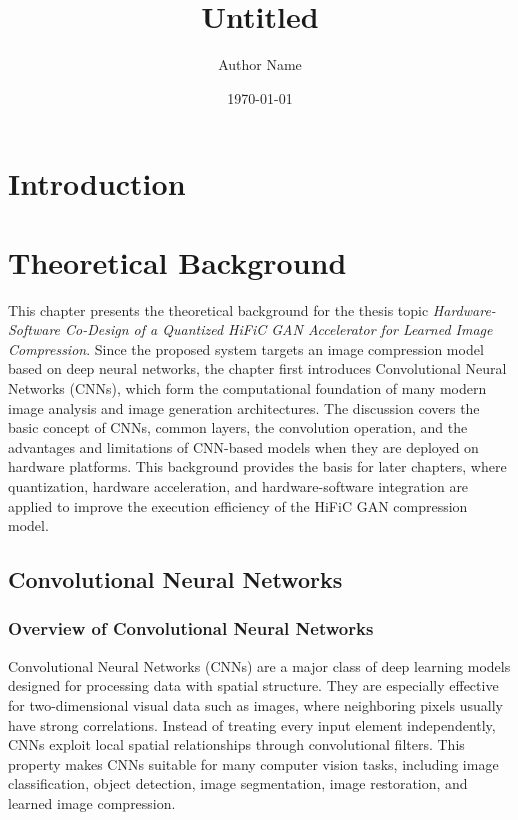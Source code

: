 \documentclass[11pt]{report}
\title{Untitled}
\author{Author Name}
\date{\today}
\begin{document}
\maketitle
\listoffigures
\clearpage

\chapter{Introduction}


\chapter{Theoretical Background}

This chapter presents the theoretical background for the thesis topic \textit{Hardware-Software Co-Design of a Quantized HiFiC GAN Accelerator for Learned Image Compression}. Since the proposed system targets an image compression model based on deep neural networks, the chapter first introduces Convolutional Neural Networks (CNNs), which form the computational foundation of many modern image analysis and image generation architectures. The discussion covers the basic concept of CNNs, common layers, the convolution operation, and the advantages and limitations of CNN-based models when they are deployed on hardware platforms. This background provides the basis for later chapters, where quantization, hardware acceleration, and hardware-software integration are applied to improve the execution efficiency of the HiFiC GAN compression model.

\section{Convolutional Neural Networks}

\subsection{Overview of Convolutional Neural Networks}

Convolutional Neural Networks (CNNs) are a major class of deep learning models designed for processing data with spatial structure. They are especially effective for two-dimensional visual data such as images, where neighboring pixels usually have strong correlations. Instead of treating every input element independently, CNNs exploit local spatial relationships through convolutional filters. This property makes CNNs suitable for many computer vision tasks, including image classification, object detection, image segmentation, image restoration, and learned image compression.
\end{document}
